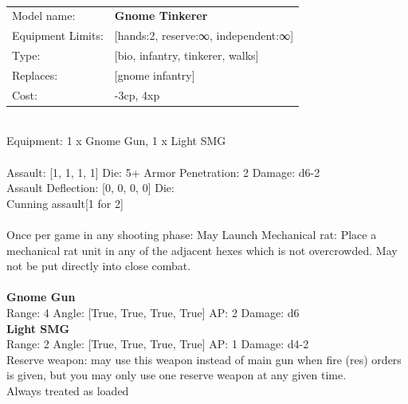  
\ \\

\noindent
\begin{tabular}{ll}
Model name: &{\bf Gnome Tinkerer } \\
Equipment Limits: &[hands:2, reserve:∞, independent:∞] \\
Type: &[bio, infantry, tinkerer, walks] \\
Replaces: &[gnome infantry] \\
Cost: & -3cp, 4xp\\
\end{tabular}
\ \\
Equipment: 1 x Gnome Gun, 1 x Light SMG \\
\ \\
Assault: [1, 1, 1, 1] Die: 5+ Armor Penetration: 2 Damage: d6-2 \\
Assault Deflection: [0, 0, 0, 0] Die: \\
\indent Cunning assault[1 for 2]\\ 
 
\ \\
Once per game in any shooting phase: May Launch Mechanical rat: Place a mechanical rat unit in any of the adjacent hexes which is not overcrowded. May not be put directly into close combat. \\ 

\ \\
{\bf Gnome Gun } \\



Range: 4  Angle: [True, True, True, True] AP: 2 Damage: d6 \\




{\bf Light SMG } \\



Range: 2  Angle: [True, True, True, True] AP: 1 Damage: d4-2 \\
Reserve weapon: may use this weapon instead of main gun when fire (res) orders is given, but you may only use one reserve weapon at any given time.\\ 
Always treated as loaded\\ 




 
\ \\

